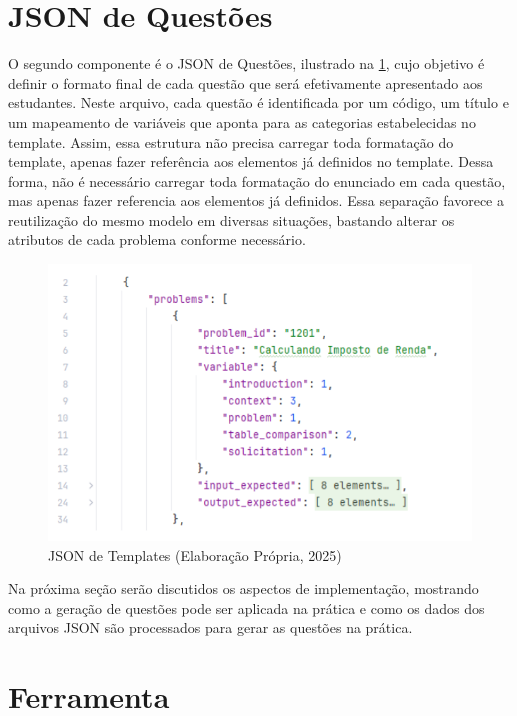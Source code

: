 \section{JSON de Questões}

O segundo componente é o JSON de Questões, ilustrado na \ref{fig:json-de-questoes}, cujo objetivo é definir o formato final de cada questão que será efetivamente apresentado aos estudantes. Neste arquivo, cada questão é identificada por um código, um título e um mapeamento de variáveis que aponta para as categorias estabelecidas no template. Assim, essa estrutura não precisa carregar toda formatação do template, apenas fazer referência aos elementos já definidos no template. Dessa forma, não é necessário carregar toda formatação do enunciado em cada questão, mas apenas fazer referencia aos elementos já definidos. Essa separação favorece a reutilização do mesmo modelo em diversas situações, bastando alterar os atributos de cada problema conforme necessário.

\begin{figure}[ht]
	\centering
	\includegraphics[width=14cm]{./imagens/capitulo7/json-de-questoes}
	\caption{JSON de Templates (Elaboração Própria, 2025) }
	\label{fig:json-de-questoes}
\end{figure}
Na próxima seção serão discutidos os aspectos de implementação, mostrando como a geração de questões pode ser aplicada na prática e como os dados dos arquivos JSON são processados para gerar  as questões na prática.

\section{Ferramenta}


